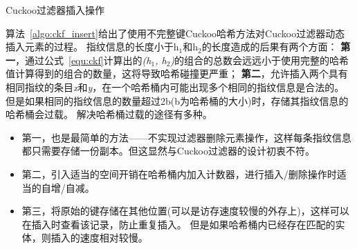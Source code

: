 \begin{algorithm}[htbp]
\SetAlgoLined
{}
\caption{Cuckoo过滤器插入操作}
\label{algo:ckf_insert}
\end{algorithm}

算法~\ref{algo:ckf_insert}给出了使用不完整键Cuckoo哈希方法对Cuckoo过滤器动态插入元素的过程。
指纹信息的长度小于h$_1$和h$_2$的长度造成的后果有两个方面：
\textbf{第一}，通过公式~\ref{equ:ckf}计算出的\textit{(h$_1$, h$_2$)}的组合的总数会远远小于使用完整的哈希值计算得到的组合的数量，这将导致哈希碰撞更严重；
\textbf{第二}，允许插入两个具有相同指纹的条目\textit{x}和\textit{y}，在一个哈希桶内可能出现多个相同的指纹信息是合法的。
但是如果相同的指纹信息的数量超过2b(b为哈希桶的大小)时，存储其指纹信息的哈希桶会过载。
解决哈希桶过载的途径有多种。
\begin{itemize}
	\item 第一，也是最简单的方法——不实现过滤器删除元素操作，这样每条指纹信息都只需要存储一份副本。但这显然与Cuckoo过滤器的设计初衷不符。
	\item 第二，引入适当的空间开销在哈希桶内加入计数器，进行插入/删除操作时适当的自增/自减。
	\item 第三，将原始的键存储在其他位置(可以是访存速度较慢的外存上)，这样可以在插入时查看该记录，防止重复插入。
	但是如果哈希桶内已经存在匹配的实体，则插入的速度相对较慢。
\end{itemize}	

